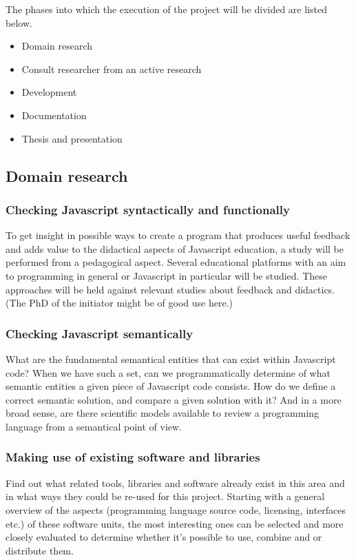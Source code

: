 \documentclass{article}
\begin{document}
The phases into which the execution of the project will be divided are listed
below.

\begin{itemize}
  \item Domain research
  \item Consult researcher from an active research
  \item Development
  \item Documentation
  \item Thesis and presentation
\end{itemize}


\subsection{Domain research}

\subsubsection{Checking Javascript syntactically and functionally}
To get insight in possible ways to create a program that produces useful
feedback and adds value to the didactical aspects of Javascript education, a
study will be performed from a pedagogical aspect. Several educational
platforms with an aim to programming in general or Javascript in particular
will be studied. These approaches will be held against relevant studies about
feedback and didactics. (The PhD of the initiator might be of good use here.)
\subsubsection{Checking Javascript semantically}
What are the fundamental semantical entities that can exist within Javascript
code? When we have such a set, can we programmatically determine of what
semantic entities a given piece of Javascript code consists. How do we define a
correct semantic solution, and compare a given solution with it? And in a more
broad sense, are there scientific models available to review a programming
language from a semantical point of view.
\subsubsection{Making use of existing software and libraries}
Find out what related tools, libraries and software already exist in this area
and in what ways they could be re-used for this project. Starting with a
general overview of the aspects (programming language source code, licensing,
interfaces etc.) of these software units, the most interesting ones can be
selected and more closely evaluated to determine whether it's possible to use,
combine and or distribute them.
\end{document}
